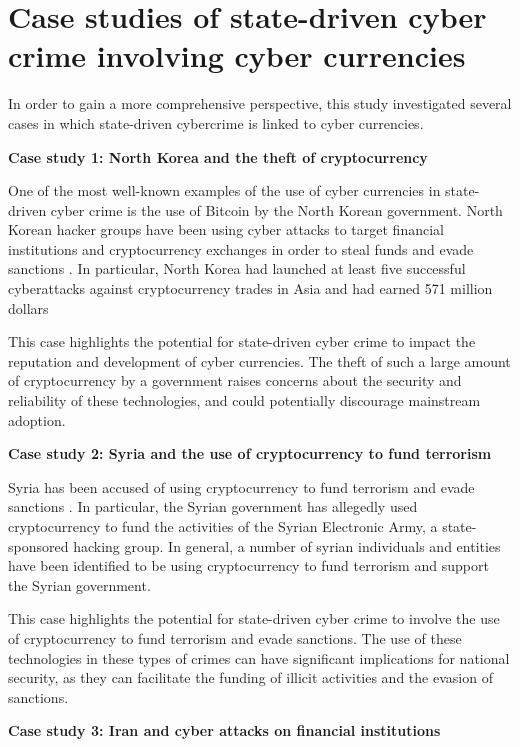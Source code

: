 \chapter{Case studies of state-driven cyber crime involving cyber currencies}

In order to gain a more comprehensive perspective, this study investigated several cases in which state-driven cybercrime is linked to cyber currencies.

\textbf{Case study 1: North Korea and the theft of cryptocurrency}

One of the most well-known examples of the use of cyber currencies in state-driven cyber crime is the use of Bitcoin by the North Korean government. North Korean hacker groups have been using cyber attacks to target financial institutions and cryptocurrency exchanges in order to steal funds and evade sanctions \cite{snyder_north_2022}. In particular, North Korea had launched at least five successful cyberattacks against cryptocurrency trades in Asia and had earned 571 million dollars \cite{kim_north_2022}

This case highlights the potential for state-driven cyber crime to impact the reputation and development of cyber currencies. The theft of such a large amount of cryptocurrency by a government raises concerns about the security and reliability of these technologies, and could potentially discourage mainstream adoption. 

\textbf{Case study 2: Syria and the use of cryptocurrency to fund terrorism}

Syria has been accused of using cryptocurrency to fund terrorism and evade sanctions \cite{lacson_21st_2016}. In particular, the Syrian government has allegedly used cryptocurrency to fund the activities of the Syrian Electronic Army, a state-sponsored hacking group. In general, a number of syrian individuals and entities have been identified to be using cryptocurrency to fund terrorism and support the Syrian government.

This case highlights the potential for state-driven cyber crime to involve the use of cryptocurrency to fund terrorism and evade sanctions. The use of these technologies in these types of crimes can have significant implications for national security, as they can facilitate the funding of illicit activities and the evasion of sanctions. 

\textbf{Case study 3: Iran and cyber attacks on financial institutions}


